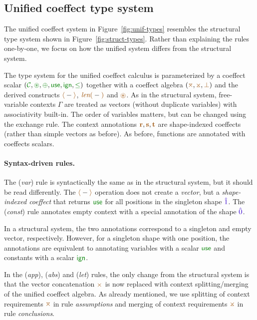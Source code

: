 \subsection{Unified coeffect type system}
\label{sec:further-types}
The unified coeffect system in Figure~\ref{fig:unif-types} resembles the structural type system
shown in Figure~\ref{fig:struct-types}. Rather than explaining the rules one-by-one, we focus on
how the unified system differs from the structural system.

The type system for the unified coeffect calculus is parameterized by a coeffect scalar
$(\C, \cseq, \cpar, \cunit, \czero, \cleq)$ together with a coeffect algebra $(\azip, \apar, \azero)$
and the derived constructs $\alift{-}$, $\alen{-}$ and $\aseq$.
As in the structural system, free-variable contexts $\Gamma$ are treated as vectors (without duplicate
variables) with associativity built-in. The order of variables matters, but can be changed
using the exchange rule. The context annotations $\aclrd{\textbf{r}}, \aclrd{\textbf{s}}, \aclrd{\textbf{t}}$
are shape-indexed coeffects (rather than simple vectors as before). As before, functions are
annotated with coeffects scalars.

\paragraph{Syntax-driven rules.}
The (\emph{var}) rule is syntactically the same as in the structural system, but it should be read
differently. The $\alift{-}$ operation does not create a \emph{vector}, but a \emph{shape-indexed
coeffect} that returns $\cunit$ for all positions in the singleton shape $\sunit$.
The (\emph{const}) rule annotates empty context with a special annotation of the shape $\sempty$.

In a structural system, the two annotations correspond to a singleton and empty vector, respectively.
However, for a singleton shape with one position, the annotations are equivalent to annotating
variables with a scalar $\cunit$ and constants with a scalar $\czero$.

In the (\emph{app}), (\emph{abs}) and (\emph{let}) rules, the only change from the structural
system is that the vector concatenation $\atimes$ is now replaced with context splitting/merging
of the unified coeffect algebra. As already mentioned, we use splitting of context requirements $\azip$
in rule \emph{assumptions} and merging of context requirements $\apar$ in rule \emph{conclusions}.

